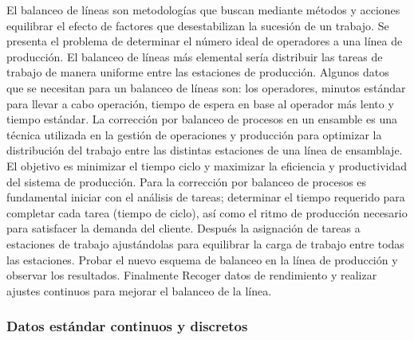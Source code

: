     El balanceo de líneas son metodologías que buscan mediante métodos y acciones equilibrar el efecto de factores que desestabilizan la sucesión de un trabajo.
    Se presenta el problema de determinar el número ideal de operadores a una línea de producción. El balanceo de líneas más elemental sería distribuir las tareas de trabajo de manera uniforme entre las estaciones de producción. Algunos datos que se necesitan para un balanceo de líneas son: los operadores, minutos estándar para llevar a cabo operación, tiempo de espera en base al operador más lento y tiempo estándar.
    La corrección por balanceo de procesos en un ensamble es una técnica utilizada en la gestión de operaciones y producción para optimizar la distribución del trabajo entre las distintas estaciones de una línea de ensamblaje. El objetivo es minimizar el tiempo ciclo y maximizar la eficiencia y productividad del sistema de producción.
    Para la corrección por balanceo de procesos es fundamental iniciar con el análisis de tareas; determinar el tiempo requerido para completar cada tarea (tiempo de ciclo), así como el ritmo de producción necesario para satisfacer la demanda del cliente. Después la asignación de tareas a estaciones de trabajo ajustándolas para equilibrar la carga de trabajo entre todas las estaciones. Probar el nuevo esquema de balanceo en la línea de producción y observar los resultados. Finalmente Recoger datos de rendimiento y realizar ajustes continuos para mejorar el balanceo de la línea.\cite{Balanceodelíneas} 
    \subsubsection{Datos estándar continuos y discretos}
    
